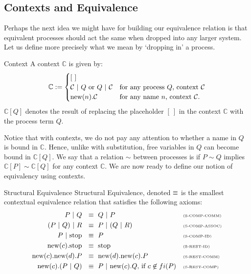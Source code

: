 \subsection{Contexts and Equivalence}
Perhaps the next idea we might have for building our equivalence relation is that equivalent processes should act the same when dropped into any larger system.  Let us define more precisely what we mean by `dropping in' a process.
\begin{definition}{Context}
	A context $\mathbb{C}$ is given by:
	\[
		\mathbb{C} := \begin{cases}
		[\ ]\\
		\mathcal{C} \ |\  Q \text{ or } Q \ |\  \mathcal{C} & \text{for any process $Q$, context $\mathcal{C}$}\\
		\text{new}({n}).\mathcal{C} & \text{for any name $n$, context $\mathcal{C}$}.
		\end{cases}
	\]
	$\mathbb{C}[Q]$ denotes the result of replacing the placeholder $[\ ]$ in the context $\mathbb{C}$ with the process term $Q$.
	\end{definition}
	Notice that with contexts, we do not pay any attention to whether a name in $Q$ is bound in $\mathbb{C}$.  Hence, unlike with substitution, free variables in $Q$ can become bound in $\mathbb{C}[Q]$.  We say that a relation $\sim$ between processes is  if $P\sim Q$ implies $\mathbb{C}[P]\sim \mathbb{C}[Q]$ for any context $\mathbb{C}$.  We are now ready to define our notion of equivalency using contexts.
	\begin{definition}{Structural Equivalence}
		Structural Equivalence, denoted $\equiv$ is the smallest contextual equivalence relation that satisfies the following axioms:
		\begin{align*}
			P \ |\  Q\ &\  \equiv\  Q \ |\  P && \text{\tiny{(S-COMP-COMM)}}\\
		 	(P \ |\  Q) \ |\  R\ &\ \equiv\ P \ |\  (Q \ |\  R) && \text{\tiny{(S-COMP-ASSOC)}}\\
			P \ |\  \text{stop}\ &\ \equiv\ P && \text{\tiny{(S-COMP-ID)}}\\
			\text{new}({c}). \text{stop}\ &\ \equiv\ \text{stop} && \text{\tiny{(S-REST-ID)}}\\
			\text{new}({c}).\text{new}({d}). P \ &\ \equiv\ \text{new}({d}).\text{new}({c}). P && \text{\tiny{(S-REST-COMM)}}\\
			\text{new}({c}).(P \ |\  Q)\ &\ \equiv\  P \ |\  \text{new}({c}).Q\text{, if } c\not\in fi(P) && \text{\tiny{(S-REST-COMP)}}
		\end{align*}
	\end{definition}
